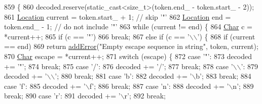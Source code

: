 \begin{DoxyCode}
859                                                                \{
860   decoded.reserve(static\_cast<size\_t>(token.end\_ - token.start\_ - 2));
861   \hyperlink{class_json_1_1_reader_a46795b5b272bf79a7730e406cb96375a}{Location} current = token.start\_ + 1; \textcolor{comment}{// skip '"'}
862   \hyperlink{class_json_1_1_reader_a46795b5b272bf79a7730e406cb96375a}{Location} end = token.end\_ - 1;       \textcolor{comment}{// do not include '"'}
863   \textcolor{keywordflow}{while} (current != end) \{
864     \hyperlink{class_json_1_1_reader_a3eec9118f3e9a672ba8348c3a79d0f45}{Char} c = *current++;
865     \textcolor{keywordflow}{if} (c == \textcolor{charliteral}{'"'})
866       \textcolor{keywordflow}{break};
867     \textcolor{keywordflow}{else} \textcolor{keywordflow}{if} (c == \textcolor{charliteral}{'\(\backslash\)\(\backslash\)'}) \{
868       \textcolor{keywordflow}{if} (current == end)
869         \textcolor{keywordflow}{return} \hyperlink{class_json_1_1_reader_af02176a1d2786b4415bbb00a1b10bb6b}{addError}(\textcolor{stringliteral}{"Empty escape sequence in string"}, token, current);
870       \hyperlink{class_json_1_1_reader_a3eec9118f3e9a672ba8348c3a79d0f45}{Char} escape = *current++;
871       \textcolor{keywordflow}{switch} (escape) \{
872       \textcolor{keywordflow}{case} \textcolor{charliteral}{'"'}:
873         decoded += \textcolor{charliteral}{'"'};
874         \textcolor{keywordflow}{break};
875       \textcolor{keywordflow}{case} \textcolor{charliteral}{'/'}:
876         decoded += \textcolor{charliteral}{'/'};
877         \textcolor{keywordflow}{break};
878       \textcolor{keywordflow}{case} \textcolor{charliteral}{'\(\backslash\)\(\backslash\)'}:
879         decoded += \textcolor{charliteral}{'\(\backslash\)\(\backslash\)'};
880         \textcolor{keywordflow}{break};
881       \textcolor{keywordflow}{case} \textcolor{charliteral}{'b'}:
882         decoded += \textcolor{charliteral}{'\(\backslash\)b'};
883         \textcolor{keywordflow}{break};
884       \textcolor{keywordflow}{case} \textcolor{charliteral}{'f'}:
885         decoded += \textcolor{charliteral}{'\(\backslash\)f'};
886         \textcolor{keywordflow}{break};
887       \textcolor{keywordflow}{case} \textcolor{charliteral}{'n'}:
888         decoded += \textcolor{charliteral}{'\(\backslash\)n'};
889         \textcolor{keywordflow}{break};
890       \textcolor{keywordflow}{case} \textcolor{charliteral}{'r'}:
891         decoded += \textcolor{charliteral}{'\(\backslash\)r'};
892         \textcolor{keywordflow}{break};

\end{DoxyCode}
